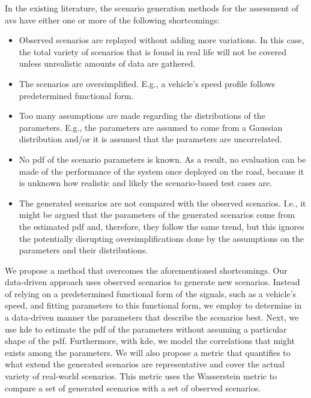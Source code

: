 In the existing literature, the scenario generation methods for the assessment of \acp{av} have either one or more of the following shortcomings:
\begin{itemize}
	\item Observed scenarios are replayed without adding more variations. 
	In this case, the total variety of scenarios that is found in real life will not be covered unless unrealistic amounts of data are gathered.
	
	\item The scenarios are oversimplified.
	E.g., a vehicle's speed profile follows predetermined functional form.
	
	\item Too many assumptions are made regarding the distributions of the parameters.
	E.g., the parameters are assumed to come from a Gaussian distribution and/or it is assumed that the parameters are uncorrelated.
	
	\item No \ac{pdf} of the scenario parameters is known. 
	As a result, no evaluation can be made of the performance of the system once deployed on the road, because it is unknown how realistic and likely the scenario-based test cases are.
	
	\item The generated scenarios are not compared with the observed scenarios. 
	I.e., it might be argued that the parameters of the generated scenarios come from the estimated \ac{pdf} and, therefore, they follow the same trend, but this ignores the potentially disrupting oversimplifications done by the assumptions on the parameters and their distributions.
\end{itemize}

We propose a method that overcomes the aforementioned shortcomings.
Our data-driven approach uses observed scenarios to generate new scenarios.
Instead of relying on a predetermined functional form of the signals, such as a vehicle's speed, and fitting parameters to this functional form, we employ  \autocite{golub2013matrix} to determine in a data-driven manner the parameters that describe the scenarios best.
Next, we use \ac{kde} \autocite{rosenblatt1956remarks, parzen1962estimation} to estimate the \ac{pdf} of the parameters without assuming a particular shape of the \ac{pdf}. 
Furthermore, with \ac{kde}, we model the correlations that might exists among the parameters.
We will also propose a metric that quantifies to what extend the generated scenarios are representative and cover the actual variety of real-world scenarios. 
This metric uses the Wasserstein metric \autocite{ruschendorf1985wasserstein} to compare a set of generated scenarios with a set of observed scenarios.

